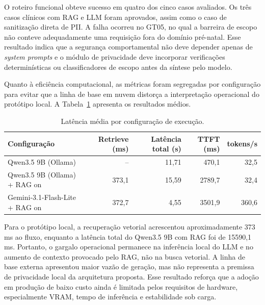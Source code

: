 \documentclass[12pt]{article}
\begin{document}
O roteiro funcional obteve sucesso em quatro dos cinco casos avaliados.
Os três casos clínicos com RAG e LLM foram aprovados, assim como o caso de sanitização direta de PII.
A falha ocorreu no GT05, no qual a barreira de escopo não conteve adequadamente uma requisição fora do domínio pré-natal.
Esse resultado indica que a segurança comportamental não deve depender apenas de \textit{system prompts} e o módulo de privacidade deve incorporar verificações determinísticas ou classificadores de escopo antes da síntese pelo modelo.

Quanto à eficiência computacional, as métricas foram segregadas por configuração para evitar que a linha de base em nuvem distorça a interpretação operacional do protótipo local. A Tabela~\ref{tab:latencia_config} apresenta os resultados médios.

\begin{table}[H]
  \centering
  \caption{Latência média por configuração de execução.}
  \label{tab:latencia_config}
  \small
  \begin{tabular}{lrrrr}
    \toprule
    \textbf{Configuração} 		& \textbf{Retrieve (ms)} 	& \textbf{Latência total (s)} 	& \textbf{TTFT (ms)} 	& \textbf{tokens/s} \\
    \midrule
    Qwen3.5 9B (Ollama)			& --    		 	& 11,71 			& 470,1  		& 32,5 \\
    Qwen3.5 9B (Ollama)   + RAG on  	& 373,1 			& 15,59 			& 2789,7 		& 32,4 \\
    Gemini-3.1-Flash-Lite + RAG on 	& 372,7 			& 4,55  			& 3501,9 		& 360,6 \\
    \bottomrule
  \end{tabular}
\end{table}

Para o protótipo local, a recuperação vetorial acrescentou aproximadamente 373 ms ao fluxo, enquanto a latência total do Qwen3.5 9B com RAG foi de 15590,1 ms.
Portanto, o gargalo operacional permanece na inferência local do LLM e no aumento de contexto provocado pelo RAG, não na busca vetorial.
A linha de base externa apresentou maior vazão de geração, mas não representa a premissa de privacidade local da arquitetura proposta.
Esse resultado reforça que a adoção em produção de baixo custo ainda é limitada pelos requisitos de hardware, especialmente VRAM, tempo de inferência e estabilidade sob carga.

\end{document}
